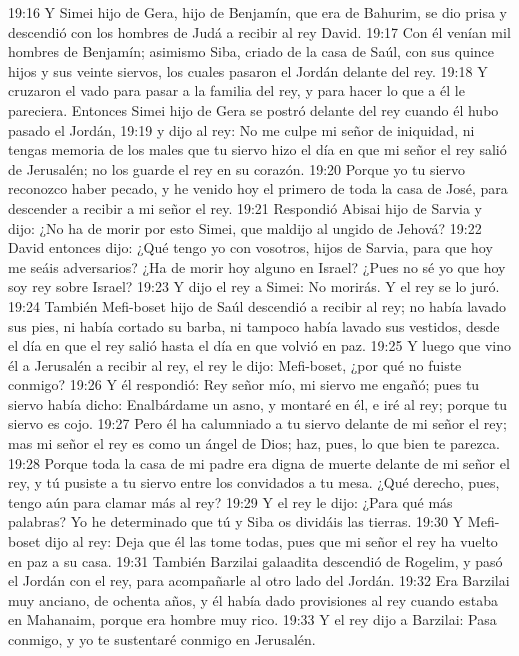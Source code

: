 19:16 Y Simei hijo de Gera, hijo de Benjamín, que era de Bahurim, se dio prisa y descendió con los hombres de Judá a recibir al rey David.  
19:17 Con él venían mil hombres de Benjamín; asimismo Siba, criado de la casa de Saúl, con sus quince hijos y sus veinte siervos, los cuales pasaron el Jordán delante del rey.  
19:18 Y cruzaron el vado para pasar a la familia del rey, y para hacer lo que a él le pareciera. Entonces Simei hijo de Gera se postró delante del rey cuando él hubo pasado el Jordán, 
19:19 y dijo al rey: No me culpe mi señor de iniquidad, ni tengas memoria de los males que tu siervo hizo el día en que mi señor el rey salió de Jerusalén; no los guarde el rey en su corazón.  
19:20 Porque yo tu siervo reconozco haber pecado, y he venido hoy el primero de toda la casa de José, para descender a recibir a mi señor el rey.  
19:21 Respondió Abisai hijo de Sarvia y dijo: ¿No ha de morir por esto Simei, que maldijo al ungido de Jehová?  
19:22 David entonces dijo: ¿Qué tengo yo con vosotros, hijos de Sarvia, para que hoy me seáis adversarios? ¿Ha de morir hoy alguno en Israel? ¿Pues no sé yo que hoy soy rey sobre Israel?  
19:23 Y dijo el rey a Simei: No morirás. Y el rey se lo juró.  
19:24 También Mefi-boset hijo de Saúl descendió a recibir al rey; no había lavado sus pies, ni había cortado su barba, ni tampoco había lavado sus vestidos, desde el día en que el rey salió hasta el día en que volvió en paz.  
19:25 Y luego que vino él a Jerusalén a recibir al rey, el rey le dijo: Mefi-boset, ¿por qué no fuiste conmigo?  
19:26 Y él respondió: Rey señor mío, mi siervo me engañó; pues tu siervo había dicho: Enalbárdame un asno, y montaré en él, e iré al rey; porque tu siervo es cojo.  
19:27 Pero él ha calumniado a tu siervo delante de mi señor el rey; mas mi señor el rey es como un ángel de Dios; haz, pues, lo que bien te parezca.  
19:28 Porque toda la casa de mi padre era digna de muerte delante de mi señor el rey, y tú pusiste a tu siervo entre los convidados a tu mesa. ¿Qué derecho, pues, tengo aún para clamar más al rey?  
19:29 Y el rey le dijo: ¿Para qué más palabras? Yo he determinado que tú y Siba os dividáis las tierras.  
19:30 Y Mefi-boset dijo al rey: Deja que él las tome todas, pues que mi señor el rey ha vuelto en paz a su casa.  
19:31 También Barzilai galaadita descendió de Rogelim, y pasó el Jordán con el rey, para acompañarle al otro lado del Jordán.  
19:32 Era Barzilai muy anciano, de ochenta años, y él había dado provisiones al rey cuando estaba en Mahanaim, porque era hombre muy rico.  
19:33 Y el rey dijo a Barzilai: Pasa conmigo, y yo te sustentaré conmigo en Jerusalén.  
